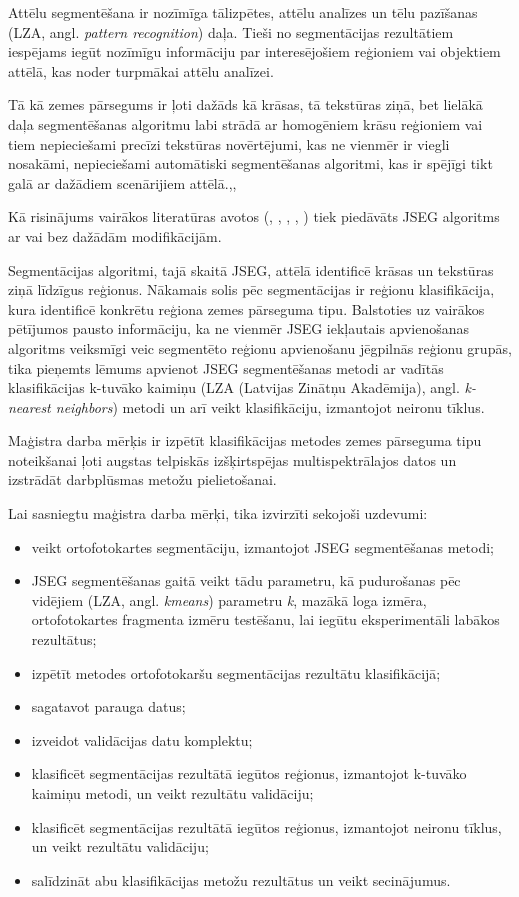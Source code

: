 \documentclass[12pt,paper=a4]{report}
\begin{document}
Attēlu segmentēšana ir nozīmīga tālizpētes, attēlu analīzes un tēlu pazīšanas (LZA, angl. \textit{pattern recognition}) daļa. Tieši no segmentācijas rezultātiem iespējams iegūt nozīmīgu informāciju par interesējošiem reģioniem vai objektiem attēlā, kas noder turpmākai attēlu analīzei.\cite{4satImSegm2012} \par 
Tā kā zemes pārsegums ir ļoti dažāds kā krāsas, tā tekstūras ziņā, bet lielākā daļa segmentēšanas algoritmu labi strādā ar homogēniem krāsu reģioniem vai tiem nepieciešami precīzi tekstūras novērtējumi, kas ne vienmēr ir viegli nosakāmi, nepieciešami automātiski segmentēšanas algoritmi, kas ir spējīgi tikt galā ar dažādiem scenārijiem attēlā.\cite{4satImSegm2012},\cite{1colImSegm1999},\cite{2unsupImSegm2001} \par
Kā risinājums vairākos literatūras avotos (\cite{4satImSegm2012}, \cite{1colImSegm1999}, \cite{2unsupImSegm2001}, \cite{6buildings2008}, \cite{5forest2007}) tiek piedāvāts JSEG algoritms ar vai bez dažādām modifikācijām. \par
Segmentācijas algoritmi, tajā skaitā JSEG, attēlā identificē krāsas un tekstūras ziņā līdzīgus reģionus. Nākamais solis pēc segmentācijas ir reģionu klasifikācija, kura identificē konkrētu reģiona zemes pārseguma tipu. Balstoties uz vairākos pētījumos pausto informāciju, ka ne vienmēr JSEG iekļautais apvienošanas algoritms veiksmīgi veic segmentēto reģionu apvienošanu jēgpilnās reģionu grupās, tika pieņemts lēmums apvienot JSEG segmentēšanas metodi ar vadītās klasifikācijas k-tuvāko kaimiņu (LZA (Latvijas Zinātņu Akadēmija), angl. \textit{k-nearest neighbors}) metodi un arī veikt klasifikāciju, izmantojot neironu tīklus. \par
Maģistra darba mērķis ir izpētīt klasifikācijas metodes zemes pārseguma tipu noteikšanai ļoti augstas telpiskās izšķirtspējas multispektrālajos datos un izstrādāt darbplūsmas metožu pielietošanai.\par Lai sasniegtu maģistra darba mērķi, tika izvirzīti sekojoši uzdevumi:
\begin{itemize}
\item veikt ortofotokartes segmentāciju, izmantojot JSEG segmentēšanas metodi;
\item JSEG segmentēšanas gaitā veikt tādu parametru, kā pudurošanas pēc vidējiem (LZA, angl. \textit{kmeans}) parametru \textit{k}, mazākā loga izmēra, ortofotokartes fragmenta izmēru testēšanu, lai iegūtu eksperimentāli labākos rezultātus;
\item izpētīt metodes ortofotokaršu segmentācijas rezultātu klasifikācijā;  
\item sagatavot parauga datus;
\item izveidot validācijas datu komplektu;
\item klasificēt segmentācijas rezultātā iegūtos reģionus, izmantojot k-tuvāko kaimiņu metodi, un veikt rezultātu validāciju;
\item klasificēt segmentācijas rezultātā iegūtos reģionus, izmantojot neironu tīklus, un veikt rezultātu validāciju;
\item salīdzināt abu klasifikācijas metožu rezultātus un veikt secinājumus.
\end{itemize}\par
\end{document}
